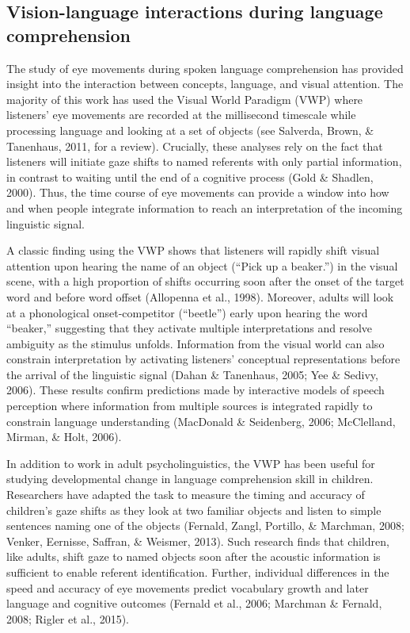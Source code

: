 \documentclass[,man,floatsintext]{apa6}
\begin{document}
\hypertarget{vision-language-interactions-during-language-comprehension}{%
\subsection{Vision-language interactions during language comprehension}\label{vision-language-interactions-during-language-comprehension}}

The study of eye movements during spoken language comprehension has provided insight into the interaction between concepts, language, and visual attention. The majority of this work has used the Visual World Paradigm (VWP) where listeners' eye movements are recorded at the millisecond timescale while processing language and looking at a set of objects (see Salverda, Brown, \& Tanenhaus, 2011, for a review). Crucially, these analyses rely on the fact that listeners will initiate gaze shifts to named referents with only partial information, in contrast to waiting until the end of a cognitive process (Gold \& Shadlen, 2000). Thus, the time course of eye movements can provide a window into how and when people integrate information to reach an interpretation of the incoming linguistic signal.

A classic finding using the VWP shows that listeners will rapidly shift visual attention upon hearing the name of an object (\enquote{Pick up a beaker.}) in the visual scene, with a high proportion of shifts occurring soon after the onset of the target word and before word offset (Allopenna et al., 1998). Moreover, adults will look at a phonological onset-competitor (\enquote{beetle}) early upon hearing the word \enquote{beaker,} suggesting that they activate multiple interpretations and resolve ambiguity as the stimulus unfolds. Information from the visual world can also constrain interpretation by activating listeners' conceptual representations before the arrival of the linguistic signal (Dahan \& Tanenhaus, 2005; Yee \& Sedivy, 2006). These results confirm predictions made by interactive models of speech perception where information from multiple sources is integrated rapidly to constrain language understanding (MacDonald \& Seidenberg, 2006; McClelland, Mirman, \& Holt, 2006).

In addition to work in adult psycholinguistics, the VWP has been useful for studying developmental change in language comprehension skill in children. Researchers have adapted the task to measure the timing and accuracy of children's gaze shifts as they look at two familiar objects and listen to simple sentences naming one of the objects (Fernald, Zangl, Portillo, \& Marchman, 2008; Venker, Eernisse, Saffran, \& Weismer, 2013). Such research finds that children, like adults, shift gaze to named objects soon after the acoustic information is sufficient to enable referent identification. Further, individual differences in the speed and accuracy of eye movements predict vocabulary growth and later language and cognitive outcomes (Fernald et al., 2006; Marchman \& Fernald, 2008; Rigler et al., 2015).
\end{document}
